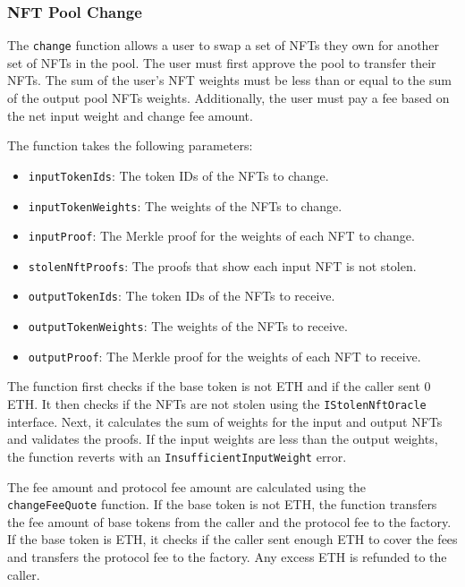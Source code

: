 \hypertarget{nft-pool-change}{%
\subsubsection{NFT Pool Change}\label{nft-pool-change}}

The \texttt{change} function allows a user to swap a set of NFTs they
own for another set of NFTs in the pool. The user must first approve the
pool to transfer their NFTs. The sum of the user's NFT weights must be
less than or equal to the sum of the output pool NFTs weights.
Additionally, the user must pay a fee based on the net input weight and
change fee amount.

The function takes the following parameters:

\begin{itemize}
\tightlist
\item
  \texttt{inputTokenIds}: The token IDs of the NFTs to change.
\item
  \texttt{inputTokenWeights}: The weights of the NFTs to change.
\item
  \texttt{inputProof}: The Merkle proof for the weights of each NFT to
  change.
\item
  \texttt{stolenNftProofs}: The proofs that show each input NFT is not
  stolen.
\item
  \texttt{outputTokenIds}: The token IDs of the NFTs to receive.
\item
  \texttt{outputTokenWeights}: The weights of the NFTs to receive.
\item
  \texttt{outputProof}: The Merkle proof for the weights of each NFT to
  receive.
\end{itemize}

The function first checks if the base token is not ETH and if the caller
sent 0 ETH. It then checks if the NFTs are not stolen using the
\texttt{IStolenNftOracle} interface. Next, it calculates the sum of
weights for the input and output NFTs and validates the proofs. If the
input weights are less than the output weights, the function reverts
with an \texttt{InsufficientInputWeight} error.

The fee amount and protocol fee amount are calculated using the
\texttt{changeFeeQuote} function. If the base token is not ETH, the
function transfers the fee amount of base tokens from the caller and the
protocol fee to the factory. If the base token is ETH, it checks if the
caller sent enough ETH to cover the fees and transfers the protocol fee
to the factory. Any excess ETH is refunded to the caller.

